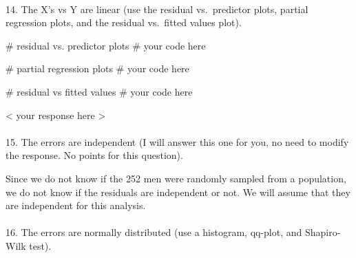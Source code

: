 \documentclass[
  letterpaper,
  DIV=11,
  numbers=noendperiod]{scrartcl}
\makeatletter
\let\oldparagraph\paragraph
\renewcommand{\paragraph}{
    \@ifstar
      \xxxParagraphStar
      \xxxParagraphNoStar
  }
\newcommand{\xxxParagraphStar}[1]{\oldparagraph*{#1}\mbox{}}
\newcommand{\xxxParagraphNoStar}[1]{\oldparagraph{#1}\mbox{}}
\newenvironment{Shaded}{\begin{snugshade}}{\end{snugshade}}
\newcommand{\CommentTok}[1]{\textcolor[rgb]{0.37,0.37,0.37}{#1}}
\makeatother
\begin{document}
\paragraph{14. The X's vs Y are linear (use the residual vs.~predictor
plots, partial regression plots, and the residual vs.~fitted values
plot).}\label{the-xs-vs-y-are-linear-use-the-residual-vs.-predictor-plots-partial-regression-plots-and-the-residual-vs.-fitted-values-plot.}

\begin{Shaded}
\begin{Highlighting}[]
\CommentTok{\# residual vs. predictor plots}
\CommentTok{\# your code here}
\end{Highlighting}
\end{Shaded}

\begin{Shaded}
\begin{Highlighting}[]
\CommentTok{\# partial regression plots}
\CommentTok{\# your code here}
\end{Highlighting}
\end{Shaded}

\begin{Shaded}
\begin{Highlighting}[]
\CommentTok{\# residual vs fitted values}
\CommentTok{\# your code here}
\end{Highlighting}
\end{Shaded}

\textless{} your response here \textgreater{}

\paragraph{15. The errors are independent (I will answer this one for
you, no need to modify the response. No points for this
question).}\label{the-errors-are-independent-i-will-answer-this-one-for-you-no-need-to-modify-the-response.-no-points-for-this-question.}

Since we do not know if the 252 men were randomly sampled from a
population, we do not know if the residuals are independent or not. We
will assume that they are independent for this analysis.

\paragraph{16. The errors are normally distributed (use a histogram,
qq-plot, and Shapiro-Wilk
test).}\label{the-errors-are-normally-distributed-use-a-histogram-qq-plot-and-shapiro-wilk-test.}
\end{document}
